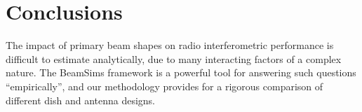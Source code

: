\documentclass{aa}
\begin{document}
% 
% 
% 
% 
% 
% 
% 
% 
% 

\section{Conclusions}

The impact of primary beam shapes on radio interferometric performance is difficult to estimate analytically, due to many interacting factors of a complex nature. The BeamSims framework is a powerful tool for answering such questions ``empirically'', and our methodology provides for a rigorous comparison of different dish and antenna designs.






\end{document}
